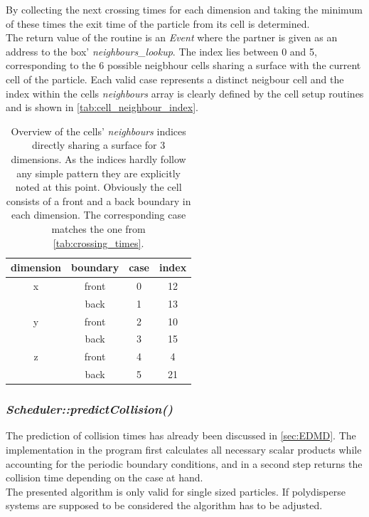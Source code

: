By collecting the next crossing times for each dimension and taking the minimum of these times the exit time of the particle from its cell is determined.\\

The return value of the routine is an \textit{Event} where the partner is given as an address to the box' \textit{neighbours\_lookup}. The index lies between 0 and 5, corresponding to the 6 possible neigbhour cells sharing a surface with the current cell of the particle. Each valid case represents a distinct neigbour cell and the index within the cells \textit{neighbours} array is clearly defined by the cell setup routines and is shown in \autoref{tab:cell_neighbour_index}. 

\begin{table}[h]
\centering
\begin{tabular}{c|c|c|c}
dimension & boundary & case & index \\ \hline
x & front & 0 & 12 \\
 & back & 1 & 13 \\ \hline
y & front & 2 & 10 \\
 & back & 3 & 15 \\ \hline
z & front & 4 & 4 \\
 & back & 5 & 21 \\
\end{tabular}
\caption{Overview of the cells' \textit{neighbours} indices directly sharing a surface for 3 dimensions. As the indices hardly follow any simple pattern they are explicitly noted at this point. Obviously the cell consists of a front and a back boundary in each dimension. The corresponding case matches the one from \autoref{tab:crossing_times}.}
\label{tab:cell_neighbour_index}
\end{table}
\FloatBarrier

\subsubsection{\quad \textit{Scheduler::predictCollision()}}
The prediction of collision times has already been discussed in \autoref{sec:EDMD}. The implementation in the program first calculates all necessary scalar products while accounting for the periodic boundary conditions, and in a second step returns the collision time depending on the case at hand.\\

The presented algorithm is only valid for single sized particles. If polydisperse systems are supposed to be considered the algorithm has to be adjusted. \\

